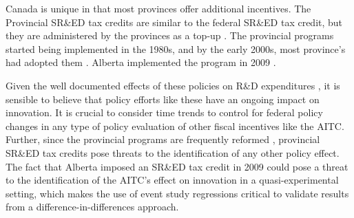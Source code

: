 \documentclass[../main.tex]{subfiles}
\begin{document}
Canada is unique in that most provinces offer additional incentives. The Provincial SR\&ED tax credits are similar to the federal SR\&ED tax credit, but they are administered by the provinces as a top-up \parencite{warda00}. The provincial programs started being implemented in the 1980s, and by the early 2000s, most province's had adopted them \parencite{warda98,mckenzie05}. Alberta implemented the program in 2009 \parencite{brouillete13}.

Given the well documented effects of these policies on R\&D expenditures \parencite{mansfield_switzer85b, agrawal_etal20, becker15}, it is sensible to believe that policy efforts like these have an ongoing impact on innovation. It is crucial to consider time trends to control for federal policy changes in any type of policy evaluation of other fiscal incentives like the AITC. Further, since the provincial programs are frequently reformed \parencite{mckenzie05}, provincial SR\&ED tax credits pose threats to the identification of any other policy effect. The fact that Alberta imposed an SR\&ED tax credit in 2009 could pose a threat to the identification of the AITC's effect on innovation in a quasi-experimental setting, which makes the use of event study regressions critical to validate results from a difference-in-differences approach.
\end{document}
